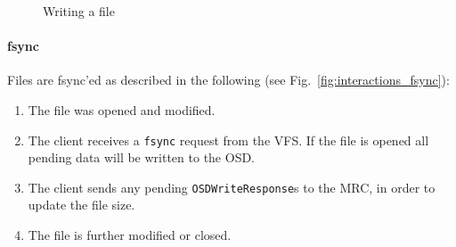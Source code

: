 \begin{figure}[h!]
\centering
{}
\caption{Writing a file}
\label{fig:interactions_write}
\end{figure}

\paragraph{fsync}

Files are fsync'ed as described in the following (see Fig.\ \ref{fig:interactions_fsync}):

\begin{enumerate}
 \item The file was opened and modified.
 \item The client receives a \texttt{fsync} request from the VFS. If the file is opened all pending data will be written to the OSD.
 \item The client sends any pending \texttt{OSDWriteResponse}s to the MRC, in order to update the file size.
 \item The file is further modified or closed.
\end{enumerate}

